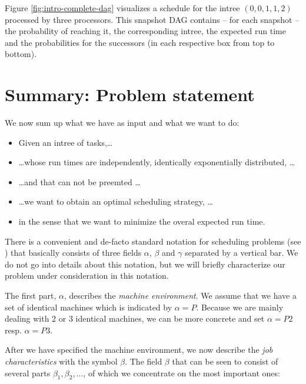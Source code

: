 Figure \ref{fig:intro-complete-dag} visualizes a schedule for the intree $(0,0,1,1,2)$ processed by three processors. This snapshot DAG contains -- for each snapshot -- the probability of reaching it, the corresponding intree, the expected run time and the probabilities for the successors (in each respective box from top to bottom).

\section{Summary: Problem statement}
\label{sec:introduction-aim}

We now sum up what we have as input and what we want to do:
\begin{itemize}
\item Given an intree of tasks,\dots
\item \dots whose run times are independently, identically exponentially distributed, \dots
\item \dots and that can not be preemted \dots
\item \dots we want to obtain an optimal scheduling strategy, \dots
\item in the sense that we want to minimize the overal expected run time.
\end{itemize}

There is a convenient and de-facto standard notation for scheduling problems (see \cite{schedulingclassification}) that basically consists of three fields $\alpha$, $\beta$ and $\gamma$ separated by a vertical bar. We do not go into details about this notation, but we will briefly characterize our problem under consideration in this notation.

The first part, $\alpha$, describes the \emph{machine environment}. We assume that we have a set of identical machines which is indicated by $\alpha = P$. Because we are mainly dealing with 2 or 3 identical machines, we can be more concrete and set $\alpha = P2$ resp. $\alpha=P3$.

After we have specified the machine environment, we now describe the \emph{job characteristics} with the symbol $\beta$. The field $\beta$ that can be seen to consist of several parts $\beta_1,\beta_2,\dots$, of which we concentrate on the most important ones:

